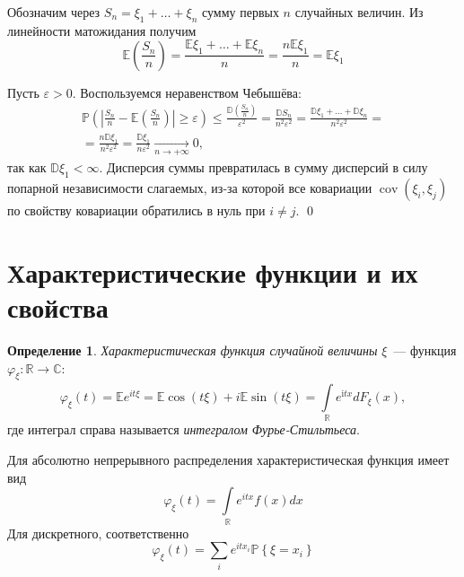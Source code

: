 \documentclass[oneside,final,14pt]{extreport}
\renewenvironment{proof}{{\bfseries Доказательство.}}{\qed}
\theoremstyle{plain}
\theoremstyle{definition}
\newtheorem*{defn}{Определение}
\theoremstyle{named}
\begin{document}
\begin{proof}
    Обозначим через $S_n = \xi_1 + \ldots + \xi_n$ сумму первых $n$ случайных величин. Из линейности матожидания получим
    \begin{equation*}
        \mathbb{E}\left(\frac{S_{n}}{n}\right)=\frac{\mathbb{E} \xi_{1}+\ldots+\mathbb{E} \xi_{n}}{n}=\frac{n \mathbb{E} \xi_{1}}{n}=\mathbb{E} \xi_{1}
    \end{equation*}
    
    Пусть $\varepsilon > 0.$ Воспользуемся неравенством Чебышёва:
    \begin{multline*}
        \mathbb{P}\left(\left|\frac{S_{n}}{n}-\mathbb{E}\left(\frac{S_{n}}{n}\right)\right| \geqslant \varepsilon\right) \leqslant \frac{\mathbb{D}\left(\frac{S_{n}}{n}\right)}{\varepsilon^{2}}
        = \frac{\mathbb{D} S_{n}}{n^{2} \varepsilon^{2}}
        = \frac{\mathbb{D} \xi_{1}+\ldots+\mathbb{D} \xi_{n}}{n^{2} \varepsilon^{2}}= \\
        = \frac{n \mathbb{D} \xi_{1}}{n^{2} \varepsilon^{2}}
        = \frac{\mathbb{D} \xi_{1}}{n \varepsilon^{2}} \xrightarrow[n \to +\infty]{} 0,
    \end{multline*}
    так как $\mathbb{D}\xi_1 < \infty$. Дисперсия суммы превратилась в сумму дисперсий в силу попарной независимости слагаемых, из-за которой все ковариации $\operatorname{cov}(\xi_i, \xi_j)$ по свойству ковариации обратились в нуль при $i \neq j$.
\end{proof}

\section{Характеристические функции и их свойства}
\begin{defn}
    {\it Характеристическая функция случайной величины} $\xi$~--- функция $\varphi_{\xi}: \mathbb{R} \rightarrow \mathbb{C}$:
    \begin{equation*}
        \varphi_{\xi}(t)
        = \mathbb{E} e^{i t \xi}
        = \mathbb{E} \cos (t \xi)+i \mathbb{E} \sin (t \xi) = \int\limits_{\mathbb{R}}^{} e^{\mathrm{i} t x} d F_{\xi}(x),
    \end{equation*}
    где интеграл справа называется {\it интегралом Фурье-Стильтьеса}.
    
    Для абсолютно непрерывного распределения характеристическая функция имеет вид
    \begin{equation*}
        \varphi_{\xi}(t)=\int\limits_{\mathbb{R}} e^{i t x} f(x) d x
    \end{equation*}
    Для дискретного, соответственно
    \begin{equation*}
        \varphi_{\xi}(t)=\sum\limits_{i} e^{i t x_{i}} \mathbb{P}\left\{\xi=x_{i}\right\}
    \end{equation*}
\end{defn}
\end{document}

